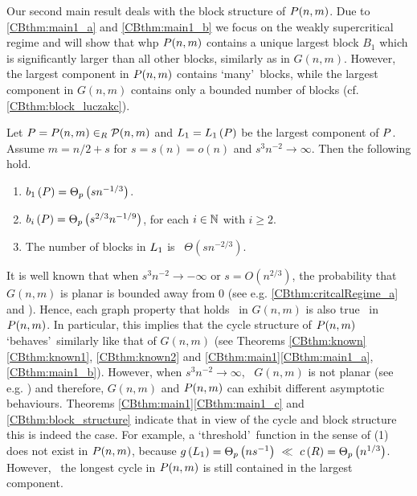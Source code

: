 Our second main result deals with the block structure of $P(n,m)$. Due to \ref{CBthm:main1_a} and \ref{CBthm:main1_b} we focus on the weakly supercritical regime and will show that whp $P(n,m)$ contains a unique largest block $B_1$ which is significantly larger than all other blocks, similarly as in $G(n,m)$. However, the largest component in $P(n,m)$ contains \lq many\rq\ blocks, while the largest component in $G(n,m)$ contains only a bounded number of blocks (cf. \ref{CBthm:block_luczakc}).
\begin{thm}\label{CBthm:block_structure}
Let $P=P(n,m) \in_R \mathcal {P}(n,m)$ and $L_1=L_1\left(P\right)$ be the largest component of $P$. 
Assume $m=n/2+s$ for $s=s(n)=o\left(n\right)$ and $s^3 n^{-2} \to \infty$. Then the following hold.
	\begin{enumerate}
		\item\label{CBthm:block_structure_a}
		$b_{1}\left(P\right)=\Theta_p\left(sn^{-1/3}\right)$.
		\item\label{CBthm:block_structure_b}
		$b_{i}\left(P\right)=\Theta_p\left(s^{2/3}n^{-1/9}\right)$, for each $i\in \mathbb{N}$ with $i\geq 2$.
		\item\label{CBthm:block_structure_c}
		The number of blocks in $L_1$ is \whp\ $\Theta\left(sn^{-2/3}\right)$.
	\end{enumerate}
\end{thm}

It is well known that when $s^3 n^{-2}\to -\infty$ or $s=O\left(n^{2/3}\right)$, the probability that $G(n,m)$ is planar is bounded away from 0 (see e.g. \ref{CBthm:critcalRegime_a} and \cite{JansonKnuthLuczakPittel1993,LuczakPittelWierman1994,NoyRavelomananaRue2015}). Hence, each graph property that holds \whp\ in $G(n,m)$ is also true \whp\ in $P(n,m)$. In particular, this implies that the cycle structure of $P(n,m)$ \lq behaves\rq\ similarly like that of $G(n,m)$ (see Theorems \ref{CBthm:known}\ref{CBthm:known1}, \ref{CBthm:known2} and \ref{CBthm:main1}\ref{CBthm:main1_a}, \ref{CBthm:main1_b}). However, when $s^3n^{-2}\to \infty$, \whp\ $G(n,m)$ is not planar (see e.g. \cite{LuczakPittelWierman1994,NoyRavelomananaRue2015}) and therefore, $G(n,m)$ and $P(n,m)$ can exhibit different asymptotic behaviours. Theorems \ref{CBthm:main1}\ref{CBthm:main1_c} and \ref{CBthm:block_structure} indicate that in view of the cycle and block structure this is indeed the case. For example, a \lq threshold\rq\ function in the sense of (1) does not exist in $P(n,m)$, because $\girth{\LargestComponent}= \Theta_p\left(n s^{-1}\right)\ \ll\ \longestCycle{\rest}=\Theta_p\left(n^{1/3}\right)$. However, \whp\ the longest cycle in $P(n,m)$ is still contained in the largest component.
	
